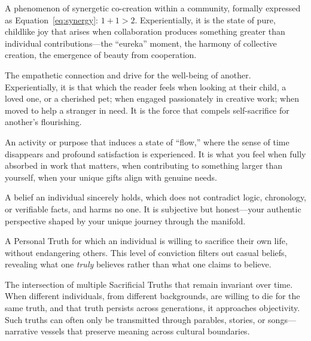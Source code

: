 \documentclass[11pt,a4paper]{article}
\begin{document}
\begin{description}[style=nextline, leftmargin=0pt, labelindent=0pt]
    \item[\textbf{God}] A phenomenon of synergetic co-creation within a community, formally expressed as Equation~\eqref{eq:synergy}: $1+1 > 2$. Experientially, it is the state of pure, childlike joy that arises when collaboration produces something greater than individual contributions—the ``eureka'' moment, the harmony of collective creation, the emergence of beauty from cooperation.

    \item[\textbf{Love}] The empathetic connection and drive for the well-being of another. Experientially, it is that which the reader feels when looking at their child, a loved one, or a cherished pet; when engaged passionately in creative work; when moved to help a stranger in need. It is the force that compels self-sacrifice for another's flourishing.

    \item[\textbf{Meaning}] An activity or purpose that induces a state of ``flow,'' where the sense of time disappears and profound satisfaction is experienced. It is what you feel when fully absorbed in work that matters, when contributing to something larger than yourself, when your unique gifts align with genuine needs.

    \item[\textbf{Personal Truth (\textit{Pravda})}] A belief an individual sincerely holds, which does not contradict logic, chronology, or verifiable facts, and harms no one. It is subjective but honest—your authentic perspective shaped by your unique journey through the manifold.

    \item[\textbf{Sacrificial Truth (\textit{Istina-Cheloveka})}] A Personal Truth for which an individual is willing to sacrifice their own life, without endangering others. This level of conviction filters out casual beliefs, revealing what one \textit{truly} believes rather than what one claims to believe.

    \item[\textbf{Objective Truth (\textit{Istina})}] The intersection of multiple Sacrificial Truths that remain invariant over time. When different individuals, from different backgrounds, are willing to die for the same truth, and that truth persists across generations, it approaches objectivity. Such truths can often only be transmitted through parables, stories, or songs—narrative vessels that preserve meaning across cultural boundaries.


\end{description}
\end{document}
